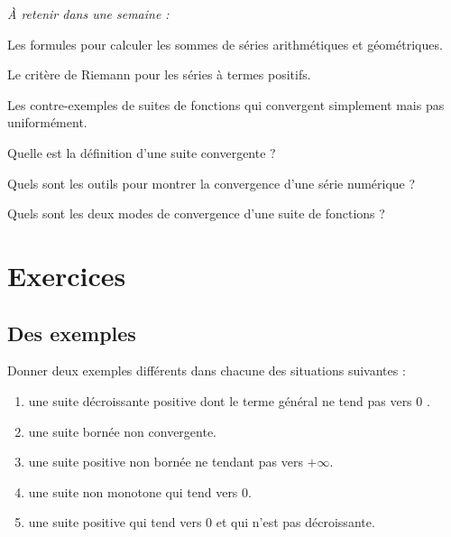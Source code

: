 
\begin{resumeBox}
  \emph{À retenir dans une semaine :} 
  \begin{niceitemize}
    \item Les formules pour calculer les sommes de séries arithmétiques et géométriques.
    \item Le critère de Riemann pour les séries à termes positifs.
    \item Les contre-exemples de suites de fonctions qui convergent simplement mais pas uniformément. 
  \end{niceitemize}
\end{resumeBox}
\begin{rappelsBox}
  \begin{niceitemize}
    \item Quelle est la définition d'une suite convergente ?
    \item Quels sont les outils pour montrer la convergence d'une série numérique ? 
    \item Quels sont les deux modes de convergence d'une suite de fonctions ?
  \end{niceitemize}
\end{rappelsBox}

\section*{Exercices}

\vspace{1em}

\subsection{Des exemples}
Donner deux exemples différents dans chacune des situations suivantes :
\begin{enumerate}[label = $\square$]
  \item une suite décroissante positive dont le terme général ne tend pas vers 0 .
  \item une suite bornée non convergente.
  \item une suite positive non bornée ne tendant pas vers $+\infty$.
  \item une suite non monotone qui tend vers 0.
  \item une suite positive qui tend vers 0 et qui n'est pas décroissante.
\end{enumerate}

